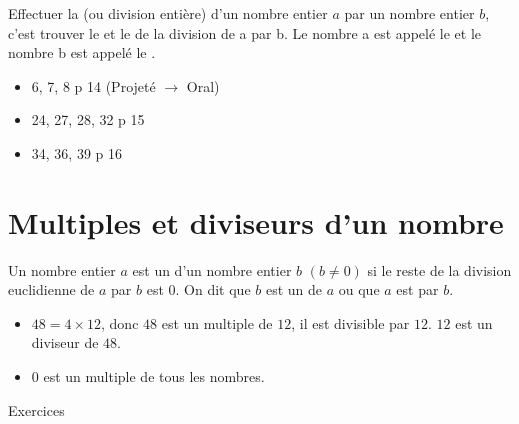 \documentclass[12pt,a4paper]{article}
\begin{document}
\begin{mybilan}
	Effectuer la  (ou division entière) d’un nombre entier $a$ par un nombre entier $b$, c’est trouver le  et le  de la division de a par b.
	Le nombre a est appelé le  et le nombre b est appelé le .
	
\end{mybilan}

\begin{myexos}
	\begin{itemize}
		\item 6, 7, 8 p 14 (Projeté $\rightarrow$ Oral)
		\item 24, 27, 28, 32 p 15
		\item 34, 36, 39 p 16
	\end{itemize}
	
\end{myexos}

\section{Multiples et diviseurs d'un nombre}

\begin{mydef}
	Un nombre entier $a$ est un  d'un nombre entier $b$ $(b \neq 0)$ si le reste de la division euclidienne de $a$ par $b$ est $0$.
	On dit que $b$ est un  de $a$ ou que $a$ est  par $b$. 
\end{mydef}

\begin{myexs}
	\begin{itemize}
		\item $48 = 4 \times 12$, donc $48$ est un multiple de $12$, il est divisible par $12$. $12$ est un diviseur de $48$.
		
		\item 0 est un multiple de tous les nombres.
		
	\end{itemize}
\end{myexs}

\begin{myexos}
	Exercices 
\end{myexos}
\end{document}
